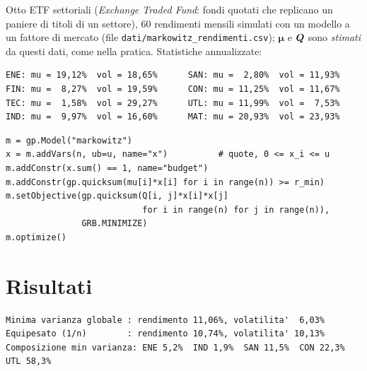 Otto ETF settoriali (\emph{Exchange Traded Fund}: fondi quotati che replicano un
paniere di titoli di un settore), 60 rendimenti mensili simulati con un modello a un fattore di
mercato (file \texttt{dati/markowitz\_rendimenti.csv}); $\boldsymbol\mu$ e $\boldsymbol{Q}$ sono \emph{stimati}
da questi dati, come nella pratica. Statistiche annualizzate:

\begin{lstlisting}[style=output]
ENE: mu = 19,12%  vol = 18,65%      SAN: mu =  2,80%  vol = 11,93%
FIN: mu =  8,27%  vol = 19,59%      CON: mu = 11,25%  vol = 11,67%
TEC: mu =  1,58%  vol = 29,27%      UTL: mu = 11,99%  vol =  7,53%
IND: mu =  9,97%  vol = 16,60%      MAT: mu = 20,93%  vol = 23,93%
\end{lstlisting}

\begin{lstlisting}[style=python]
m = gp.Model("markowitz")
x = m.addVars(n, ub=u, name="x")          # quote, 0 <= x_i <= u
m.addConstr(x.sum() == 1, name="budget")
m.addConstr(gp.quicksum(mu[i]*x[i] for i in range(n)) >= r_min)
m.setObjective(gp.quicksum(Q[i, j]*x[i]*x[j]
                           for i in range(n) for j in range(n)),
               GRB.MINIMIZE)
m.optimize()
\end{lstlisting}

\section{Risultati}

\begin{lstlisting}[style=output]
Minima varianza globale : rendimento 11,06%, volatilita'  6,03%
Equipesato (1/n)        : rendimento 10,74%, volatilita' 10,13%
Composizione min varianza: ENE 5,2%  IND 1,9%  SAN 11,5%  CON 22,3%  UTL 58,3%
\end{lstlisting}

